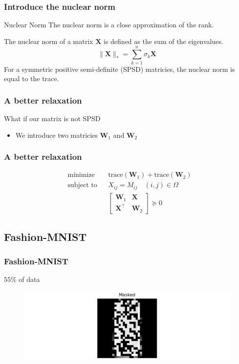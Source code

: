 \documentclass[
	11pt, %
]{beamer}
\begin{document}
\begin{frame}
	\frametitle{Introduce the nuclear norm}
	\vspace{-4em}
	\begin{block}{Nuclear Norm}
		The nuclear norm is a close approximation of the rank.
	\end{block}
	\vspace{2em}
	
	The nuclear norm of a matrix $\mathbf{X}$ is defined as the sum of 
	the eigenvalues.
	\[
	\lVert \mathbf{X} \rVert_* = \sum_{k=1}^n \sigma_k {\mathbf{X}}  
	\]
	For a symmetric positive semi-definite (SPSD) matricies, the nuclear norm is equal to the trace. 
\end{frame}


\begin{frame}
	\frametitle{A better relaxation}
	What if our matrix is not SPSD
	\begin{itemize}
		\item We introduce two matricies $\mathbf{W}_1$ and $\mathbf{W}_2$ 
	\end{itemize}
\end{frame}

\begin{frame}
	\frametitle{A better relaxation}

	\begin{equation*}
		\begin{aligned}
		& {\text{minimize}}
		& & \text{trace}(\mathbf{W}_1) + \text{trace}(\mathbf{W}_2) \\[1pt]
		& \text{subject to}
		& & X_{ij} = M_{ij} \quad (i,j) \in \Omega\\[1pt]
		&&& \begin{bmatrix} 
		  \mathbf{W}_1 & \mathbf{X} \\
		  \mathbf{X}^\top & \mathbf{W}_2
		\end{bmatrix} \succeq 0 
		\end{aligned}
	  \end{equation*}	
\end{frame}

\subsection{Fashion-MNIST} 

\begin{frame}
	\frametitle{Fashion-MNIST}
	$55 \%$ of data
	\begin{figure}
		\centering
		\includegraphics[scale=.3]{assets/mc_ex1_masked.jpeg}
	\end{figure}
\end{frame}
\end{document}
